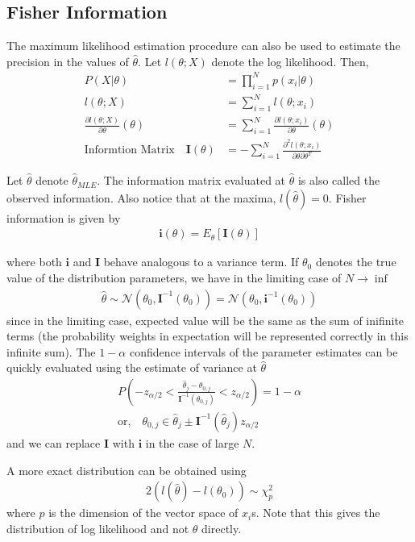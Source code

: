 \documentclass[../../statistical_learning_notes.tex]{subfiles}
\begin{document}
\subsection{Fisher Information}
The maximum likelihood estimation procedure can also be used to estimate the precision in the values of $\hat{\theta}$. Let $l(\theta;X)$ denote the log likelihood. Then,
\begin{align*}
    P(X|\theta) &= \prod_{i=1}^{N} p(x_{i}|\theta)\\
    l(\theta;X) &= \sum_{i=1}^{N} l(\theta;x_{i})\\
    \frac{\partial l(\theta;X)}{\partial \theta}(\theta) &= \sum_{i=1}^{N} \frac{\partial l(\theta;x_{i})}{\partial \theta}(\theta)\\
    \text{Informtion Matrix} \quad \mathbf{I}(\theta) &= -\sum_{i=1}^{N} \frac{\partial^{2}l(\theta;x_{i})}{\partial \theta \partial \theta^{T}}
\end{align*}

Let $\hat{\theta}$ denote $\hat{\theta}_{MLE}$. The information matrix evaluated at $\hat{\theta}$ is also called the observed information. Also notice that at the maxima, $l(\hat{\theta}) = 0$. Fisher information is given by
\begin{align*}
    \mathbf{i}(\theta) = E_{\theta}[\mathbf{I}(\theta)]
\end{align*}

where both $\mathbf{i}$ and $\mathbf{I}$ behave analogous to a variance term. If $\theta_{0}$ denotes the true value of the distribution parameters, we have in the limiting case of $N \rightarrow \inf$
\begin{align*}
    \hat{\theta} \sim \mathcal{N}(\theta_{0}, \mathbf{I}^{-1}(\theta_{0})) = \mathcal{N}(\theta_{0}, \mathbf{i}^{-1}(\theta_{0}))
\end{align*}
since in the limiting case, expected value will be the same as the sum of inifinite terms (the probability weights in expectation will be represented correctly in this infinite sum).\newline
The $1-\alpha$ confidence intervals of the parameter estimates can be quickly evaluated using the estimate of variance at $\hat{\theta}$
\begin{gather*}
    P(-z_{\alpha/2} < \frac{\hat{\theta}_{j} - \theta_{0,j}}{\mathbf{I}^{-1}(\theta_{0,j})} < z_{\alpha/2}) = 1 - \alpha\\
    \text{or,} \quad \theta_{0,j} \in \hat{\theta}_{j} \pm \mathbf{I}^{-1}(\hat{\theta}_{j})z_{\alpha/2}
\end{gather*}
and we can replace $\mathbf{I}$ with $\mathbf{i}$ in the case of large $N$.\newline

A more exact distribution can be obtained using
\begin{align*}
    2(l(\hat{\theta}) - l(\theta_{0})) \sim \chi^{2}_{p}
\end{align*}
where $p$ is the dimension of the vector space of $x_{i}$s. Note that this gives the distribution of log likelihood and not $\theta$ directly.
\end{document}
